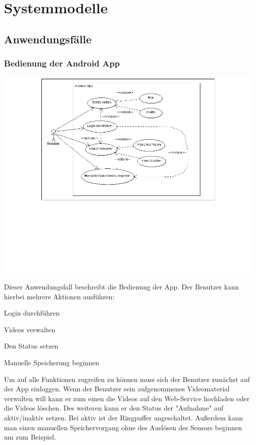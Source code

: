 \chapter{Systemmodelle}
\section{Anwendungsfälle}
\subsection{Bedienung der Android App}
\begin{center}
\includegraphics[width=1\textwidth]{subtopicsFuncspec/systemModels/AppAWFDiagram.png}
\end{center}
Dieser Anwendungsfall beschreibt die Bedienung der App. 
Der Benutzer kann hierbei mehrere Aktionen ausführen:
\begin{description}
\item Login durchführen
\item Videos verwalten
\item Den Status setzen
\item Manuelle Speicherung beginnen
\end{description}
Um auf alle Funktionen zugreifen zu können muss sich der Benutzer zunächst auf der App einloggen. 
Wenn der Benutzer sein aufgenommenes Videomaterial verwalten will kann er zum einen die Videos auf den Web-Service hochladen oder die Videos löschen.
Des weiteren kann er den Status der "Aufnahme" auf aktiv/inaktiv setzen. Bei aktiv ist der Ringpuffer angeschaltet. 
Außerdem kann man einen manuellen Speichervorgang ohne des Auslösen des Sensors beginnen um zum Beispiel.

